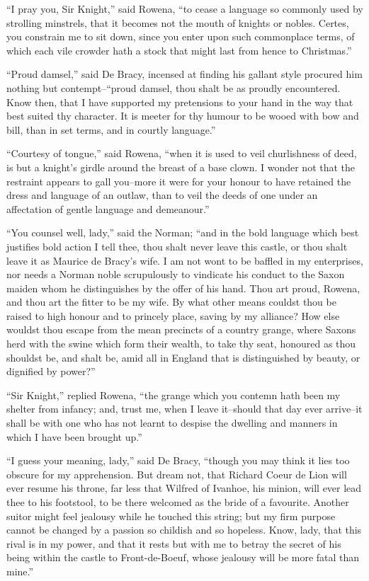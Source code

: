 ``I pray you, Sir Knight,'' said Rowena, ``to cease a language so
commonly used by strolling minstrels, that it becomes not the mouth of
knights or nobles. Certes, you constrain me to sit down, since you enter
upon such commonplace terms, of which each vile crowder hath a stock
that might last from hence to Christmas.''

``Proud damsel,'' said De Bracy, incensed at finding his gallant style
procured him nothing but contempt--``proud damsel, thou shalt be as
proudly encountered. Know then, that I have supported my pretensions to
your hand in the way that best suited thy character. It is meeter for
thy humour to be wooed with bow and bill, than in set terms, and in
courtly language.''

``Courtesy of tongue,'' said Rowena, ``when it is used to veil
churlishness of deed, is but a knight's girdle around the breast of a
base clown. I wonder not that the restraint appears to gall you--more it
were for your honour to have retained the dress and language of an
outlaw, than to veil the deeds of one under an affectation of gentle
language and demeanour.''

``You counsel well, lady,'' said the Norman; ``and in the bold language
which best justifies bold action I tell thee, thou shalt never leave
this castle, or thou shalt leave it as Maurice de Bracy's wife. I am not
wont to be baffled in my enterprises, nor needs a Norman noble
scrupulously to vindicate his conduct to the Saxon maiden whom he
distinguishes by the offer of his hand. Thou art proud, Rowena, and thou
art the fitter to be my wife. By what other means couldst thou be raised
to high honour and to princely place, saving by my alliance? How else
wouldst thou escape from the mean precincts of a country grange, where
Saxons herd with the swine which form their wealth, to take thy seat,
honoured as thou shouldst be, and shalt be, amid all in England that is
distinguished by beauty, or dignified by power?''

``Sir Knight,'' replied Rowena, ``the grange which you contemn hath been
my shelter from infancy; and, trust me, when I leave it--should that day
ever arrive--it shall be with one who has not learnt to despise the
dwelling and manners in which I have been brought up.''

``I guess your meaning, lady,'' said De Bracy, ``though you may think it
lies too obscure for my apprehension. But dream not, that Richard Coeur
de Lion will ever resume his throne, far less that Wilfred of Ivanhoe,
his minion, will ever lead thee to his footstool, to be there welcomed
as the bride of a favourite. Another suitor might feel jealousy while he
touched this string; but my firm purpose cannot be changed by a passion
so childish and so hopeless. Know, lady, that this rival is in my power,
and that it rests but with me to betray the secret of his being within
the castle to Front-de-Boeuf, whose jealousy will be more fatal than
mine.''

